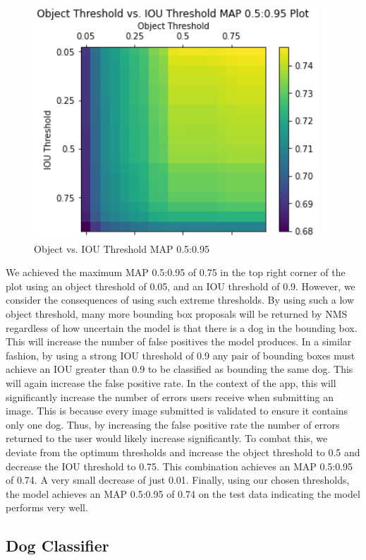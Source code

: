 \documentclass{article}
\begin{document}
\begin{figure}[h]
\centering
	\includegraphics[scale=0.7]{final-report-images/map0.5to0.95.png}
\caption{Object vs. IOU Threshold MAP 0.5:0.95}
\label{fig:x object v iou}
\end{figure}
\newpage
\noindent We achieved the maximum MAP 0.5:0.95 of 0.75 in the top right corner of the plot using an object threshold of 0.05, and an IOU threshold of 0.9.  However, we consider the consequences of using such extreme thresholds.  By using such a low object threshold, many more bounding box proposals will be returned by NMS regardless of how uncertain the model is that there is a dog in the bounding box.  This will increase the number of false positives the model produces.  In a similar fashion, by using a strong IOU threshold of 0.9 any pair of bounding boxes must achieve an IOU greater than 0.9 to be classified as bounding the same dog.  This will again increase the false positive rate.  In the context of the app, this will significantly increase the number of errors users receive when submitting an image.  This is because every image submitted is validated to ensure it contains only one dog.  Thus, by increasing the false positive rate the number of errors returned to the user would likely increase significantly.  To combat this, we deviate from the optimum thresholds and increase the object threshold to 0.5 and decrease the IOU threshold to 0.75.  This combination achieves an MAP 0.5:0.95 of 0.74.  A very small decrease of just 0.01.  Finally, using our chosen thresholds, the model achieves an MAP 0.5:0.95 of 0.74 on the test data indicating the model performs very well.

\subsection{Dog Classifier}
\end{document}
